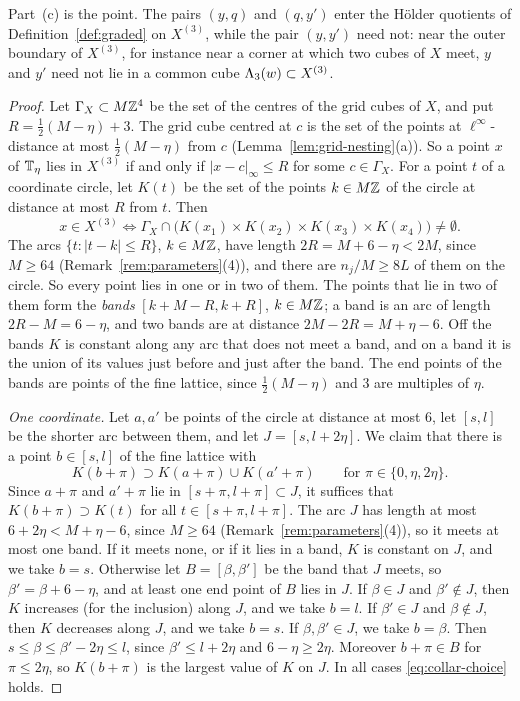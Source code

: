 Part~(c) is the point. The pairs $(y,q)$ and $(q,y')$ enter the H\"older quotients of Definition~\ref{def:graded} on $X^{(3)}$, while the pair $(y,y')$ need not: near the outer boundary of $X^{(3)}$, for instance near a corner at which two cubes of $X$ meet, $y$ and $y'$ need not lie in a common cube $\Lambda_3(w)\subset X^{(3)}$.

\begin{proof}
Let $\Gamma_X\subset M\mathbb Z^4$ be the set of the centres of the grid cubes of $X$, and put $R=\frac12(M-\eta)+3$. The grid cube centred at $c$ is the set of the points at $\ell^\infty$-distance at most $\frac12(M-\eta)$ from $c$ (Lemma~\ref{lem:grid-nesting}(a)). So a point $x$ of $\mathbb T_\eta$ lies in $X^{(3)}$ if and only if $|x-c|_\infty\le R$ for some $c\in\Gamma_X$. For a point $t$ of a coordinate circle, let $K(t)$ be the set of the points $k\in M\mathbb Z$ of the circle at distance at most $R$ from $t$. Then
\begin{equation}\label{eq:collar-membership}
x\in X^{(3)}\iff\Gamma_X\cap\big(K(x_1)\times K(x_2)\times K(x_3)\times K(x_4)\big)\ne\emptyset .
\end{equation}
The arcs $\{t:|t-k|\le R\}$, $k\in M\mathbb Z$, have length $2R=M+6-\eta<2M$, since $M\ge64$ (Remark~\ref{rem:parameters}(4)), and there are $n_j/M\ge8L$ of them on the circle. So every point lies in one or in two of them. The points that lie in two of them form the \emph{bands} $[k+M-R,k+R]$, $k\in M\mathbb Z$; a band is an arc of length $2R-M=6-\eta$, and two bands are at distance $2M-2R=M+\eta-6$. Off the bands $K$ is constant along any arc that does not meet a band, and on a band it is the union of its values just before and just after the band. The end points of the bands are points of the fine lattice, since $\frac12(M-\eta)$ and $3$ are multiples of $\eta$.

\emph{One coordinate.} Let $a,a'$ be points of the circle at distance at most $6$, let $[s,l]$ be the shorter arc between them, and let $J=[s,l+2\eta]$. We claim that there is a point $b\in[s,l]$ of the fine lattice with
\begin{equation}\label{eq:collar-choice}
K(b+\pi)\supset K(a+\pi)\cup K(a'+\pi)\qquad\text{for }\pi\in\{0,\eta,2\eta\}.
\end{equation}
Since $a+\pi$ and $a'+\pi$ lie in $[s+\pi,l+\pi]\subset J$, it suffices that $K(b+\pi)\supset K(t)$ for all $t\in[s+\pi,l+\pi]$. The arc $J$ has length at most $6+2\eta<M+\eta-6$, since $M\ge64$ (Remark~\ref{rem:parameters}(4)), so it meets at most one band. If it meets none, or if it lies in a band, $K$ is constant on $J$, and we take $b=s$. Otherwise let $B=[\beta,\beta']$ be the band that $J$ meets, so $\beta'=\beta+6-\eta$, and at least one end point of $B$ lies in $J$. If $\beta\in J$ and $\beta'\notin J$, then $K$ increases (for the inclusion) along $J$, and we take $b=l$. If $\beta'\in J$ and $\beta\notin J$, then $K$ decreases along $J$, and we take $b=s$. If $\beta,\beta'\in J$, we take $b=\beta$. Then $s\le\beta\le\beta'-2\eta\le l$, since $\beta'\le l+2\eta$ and $6-\eta\ge2\eta$. Moreover $b+\pi\in B$ for $\pi\le2\eta$, so $K(b+\pi)$ is the largest value of $K$ on $J$. In all cases \eqref{eq:collar-choice} holds.


\end{proof}
